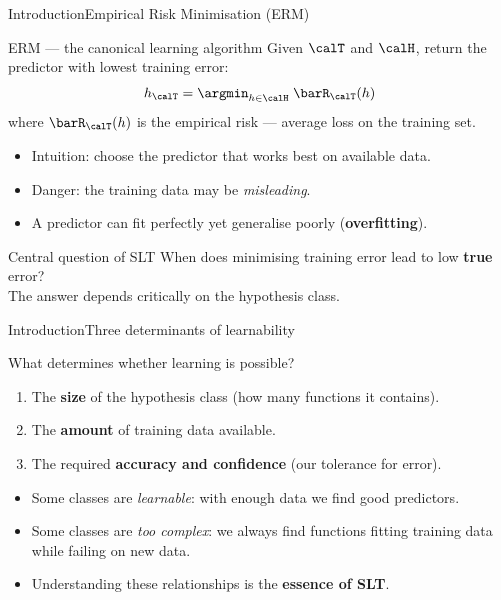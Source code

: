 \begin{frame}{Introduction}{Empirical Risk Minimisation (ERM)}
  \begin{block}{ERM — the canonical learning algorithm}
    Given $\calT$ and $\calH$, return the predictor with lowest training error:
    \[
      h_\calT = \argmin_{h \in \calH}\; \barR_\calT(h)
    \]
    where $\barR_\calT(h)$ is the empirical risk — average loss on the training set.
  \end{block}
  \bigskip
  \begin{itemize}
    \item Intuition: choose the predictor that works best on available data.
    \item Danger: the training data may be \emph{misleading}.
    \item A predictor can fit perfectly yet generalise poorly (\textbf{overfitting}).
  \end{itemize}
  \bigskip
  \begin{alertblock}{Central question of SLT}
    When does minimising training error lead to low \textbf{true} error?\\
    The answer depends critically on the hypothesis class.
  \end{alertblock}
\end{frame}

\begin{frame}{Introduction}{Three determinants of learnability}
  \begin{block}{What determines whether learning is possible?}
    \begin{enumerate}
      \item The \textbf{size} of the hypothesis class (how many functions it contains).
      \item The \textbf{amount} of training data available.
      \item The required \textbf{accuracy and confidence} (our tolerance for error).
    \end{enumerate}
  \end{block}
  \bigskip
  \begin{itemize}
    \item Some classes are \emph{learnable}: with enough data we find good predictors.
    \item Some classes are \emph{too complex}: we always find functions fitting training
          data while failing on new data.
    \item Understanding these relationships is the \textbf{essence of SLT}.
  \end{itemize}
\end{frame}

